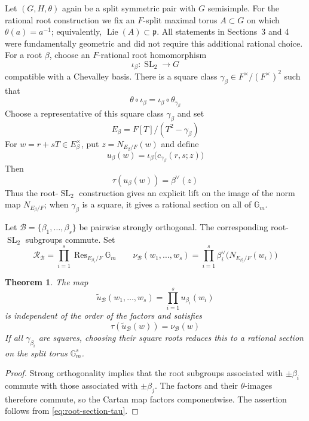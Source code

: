 \documentclass[11pt]{amsart}
\newtheorem{theorem}{Theorem}[section]
\theoremstyle{definition}
\theoremstyle{remark}
\newcommand{\cB}{\mathcal B}
\newcommand{\Gm}{\mathbb G_m}
\newcommand{\Lie}{\operatorname{Lie}}
\newcommand{\SL}{\operatorname{SL}}
\newcommand{\p}{\mathfrak p}
\begin{document}
Let $(G,H,\theta)$ again be a split symmetric pair with $G$ semisimple.  For the rational
root construction we fix an $F$-split maximal torus $A\subset G$ on which
$\theta(a)=a^{-1}$; equivalently, $\Lie(A)\subset\p$.  All statements in
Sections~3 and 4 were fundamentally geometric and did not require this additional rational
choice.  For a root $\beta$, choose an
$F$-rational root homomorphism
\[
 \iota_\beta:\SL_2\longrightarrow G
\]
compatible with a Chevalley basis.  There is a square class
$\gamma_\beta\in F^\times/(F^\times)^2$ such that
\[
 \theta\circ\iota_\beta
 =\iota_\beta\circ\theta_{\gamma_\beta}
\]
Choose a representative of this square class $\gamma_\beta$ and set
\[
 E_\beta=F[T]/(T^2-\gamma_\beta)
\]
For $w=r+sT\in E_\beta^\times$, put
$z=N_{E_\beta/F}(w)$ and define
\[
 u_\beta(w)=
 \iota_\beta\bigl(c_{\gamma_\beta}(r,s;z)\bigr)
\]
Then
\begin{equation}\label{eq:root-section-tau}
 \tau(u_\beta(w))=\beta^\vee(z)
\end{equation}
Thus the root-$\SL_2$ construction gives an explicit lift on the image of
the norm map $N_{E_\beta/F}$; when $\gamma_\beta$ is a square, it gives a
rational section on all of $\Gm$.

Let $\cB=\{\beta_1,\ldots,\beta_s\}$ be pairwise strongly orthogonal.
The corresponding root-$\SL_2$ subgroups commute.  Set
\[
 \mathcal R_\cB=\prod_{i=1}^s
       \operatorname{Res}_{E_{\beta_i}/F}\Gm
 \qquad
 \nu_\cB(w_1,\ldots,w_s)
 =\prod_{i=1}^s\beta_i^\vee
       \bigl(N_{E_{\beta_i}/F}(w_i)\bigr)
\]

\begin{theorem}\label{thm:orthogonal-section}
The map
\[
 \widetilde u_\cB(w_1,\ldots,w_s)
 =\prod_{i=1}^s u_{\beta_i}(w_i)
\]
is independent of the order of the factors and satisfies
\[
 \tau(\widetilde u_\cB(w))=\nu_\cB(w)
\]
If all $\gamma_{\beta_i}$ are squares, choosing their square roots reduces
this to a rational section on the split torus $\Gm^s$.
\end{theorem}

\begin{proof}
Strong orthogonality implies that the root subgroups associated with
$\pm\beta_i$ commute with those associated with $\pm\beta_j$.  The factors
and their $\theta$-images therefore commute, so the Cartan map factors
componentwise.  The assertion follows from
\eqref{eq:root-section-tau}.
\end{proof}
\end{document}
